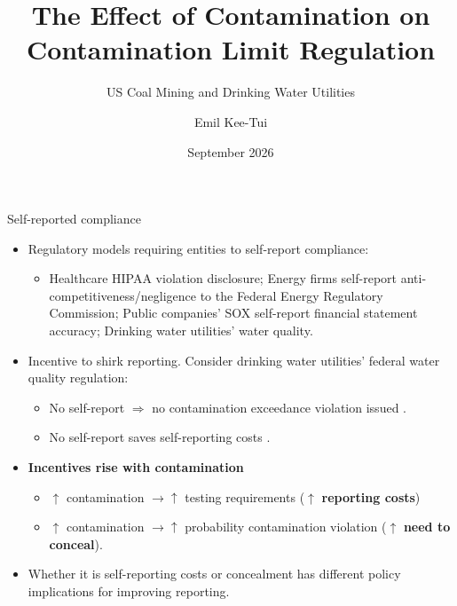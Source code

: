 \documentclass{beamer}
\title[Contamination and Self-Reported Compliance]{The Effect of Contamination on Contamination Limit Regulation}
\subtitle{US Coal Mining and Drinking Water Utilities}
\author{Emil Kee-Tui}
\institute{Charles H. Dyson School of Applied Economics and Management \\ Cornell University}
\date{September 2026}
\begin{document}
\begin{frame}
\titlepage
\end{frame}

\begin{frame}{Self-reported compliance}
\begin{itemize}
    \item Regulatory models requiring entities to self-report compliance:
    \begin{itemize}
        \item Healthcare HIPAA violation disclosure; Energy firms self-report anti-competitiveness/negligence to the Federal Energy Regulatory Commission; Public companies' SOX self-report financial statement accuracy; Drinking water utilities' water quality.
    \end{itemize}
    \item Incentive to shirk reporting. Consider drinking water utilities' federal water quality regulation:
    \begin{itemize}
        \item No self-report $\Rightarrow$ no contamination exceedance violation issued \parencite{naylor5537637strategic, zou2021unwatched}.
        \item No self-report saves self-reporting costs \parencite{oleckno1982national}.
    \end{itemize}
    \item \textbf{Incentives rise with contamination}
    \begin{itemize}
        \item $\uparrow$ contamination $\rightarrow \uparrow$ testing requirements ($\uparrow$ \textbf{reporting costs})
        \item $\uparrow$ contamination $\rightarrow \uparrow$ probability contamination violation ($\uparrow$ \textbf{need to conceal}).
    \end{itemize}
    \item Whether it is self-reporting costs or concealment has different policy implications for improving reporting.
\end{itemize}
\end{frame}
\end{document}
